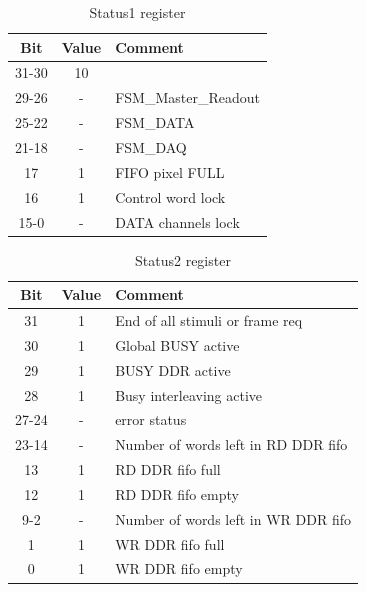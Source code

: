 \begin{table}[p]
\caption{\label{Status1} Status1 register}
\begin{center}
\begin{tabular}{|c|c|p{10cm}|}
\hline
Bit				& Value 		& Comment \\
\hline
31-30 				& 10			&   \\
\hline
29-26				& -		& FSM\_Master\_Readout  \\
\hline
25-22				& -			& FSM\_DATA \\
\hline
21-18				& -	& FSM\_DAQ \\
\hline
17				& 1			& FIFO pixel FULL\\
\hline
16				& 1	& Control word lock \\
\hline
15-0			& -	& DATA channels lock \\
\hline
\end{tabular}
\end{center}
\end{table}

\begin{table}[p]
\caption{\label{Status2} Status2 register}
\begin{center}
\begin{tabular}{|c|c|p{10cm}|}
\hline
Bit				& Value 		& Comment \\
\hline
31 				& 1			& End of all stimuli or frame req  \\
\hline
30				& 1		& Global BUSY active  \\
\hline
29				& 1			& BUSY DDR active \\
\hline
28				& 1	& Busy interleaving active \\
\hline
27-24				& -			& error status\\
\hline
23-14				& -	& Number of words left in RD DDR fifo \\
\hline
13			& 1	& RD DDR fifo full \\
\hline
12			& 1	& RD DDR fifo empty \\
\hline
9-2			& -	& Number of words left in WR DDR fifo \\
\hline
1			& 1	& WR DDR fifo full \\
\hline
0			& 1	& WR DDR fifo empty \\
\hline
\end{tabular}
\end{center}
\end{table}


